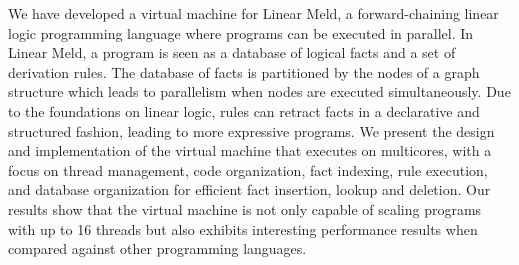 
We have developed a virtual machine for Linear Meld, a forward-chaining linear logic programming language
where programs can be executed in parallel. In Linear Meld, a program is seen as a database of logical facts and a set of derivation rules.
The database of facts is partitioned by the nodes of a graph structure which leads
to parallelism when nodes are executed simultaneously.
Due to the foundations on linear logic, rules can retract facts in a declarative and structured fashion, leading
to more expressive programs.
We present the design and implementation of the virtual machine that executes on multicores,
with a focus on thread management, code organization, fact indexing, rule execution, and database organization for efficient fact insertion,
lookup and deletion. Our results show that the virtual machine is not only
capable of scaling programs with up to 16 threads but also exhibits interesting performance results when
compared against other programming languages.
